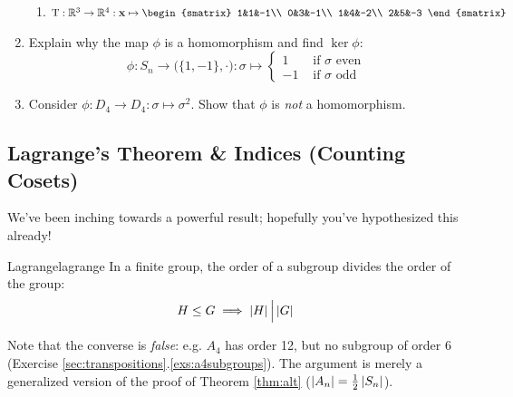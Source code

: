 \begin{exercises}{}{}
\begin{enumerate}
\begin{enumerate}
			\item $\rT:\R^3\to\R^4:\vx\mapsto 
			\begin{smatrix}
				1&1&-1\\
				0&3&-1\\
				1&4&-2\\
				2&5&-3
			\end{smatrix}$
		\end{enumerate}
		
		
		\item Explain why the map $\phi$ is a homomorphism and find $\ker\phi$:
		\[
			\phi:S_n\to \bigl(\{1,-1\},\cdot\bigr):\sigma \mapsto 
			\begin{cases}
	  		1&\text{ if $\sigma$ even}\\
	  		-1&\text{ if $\sigma$ odd}
			\end{cases}
		\]
		
		
	  \item Consider $\phi:D_4\to D_4:\sigma\mapsto \sigma^2$. Show that $\phi$ is \emph{not} a homomorphism.
	\end{enumerate}
\end{exercises}


\clearpage


\subsection{Lagrange's Theorem \& Indices (Counting Cosets)}\label{sec:lagrange}


We've been inching towards a powerful result; hopefully you've hypothesized this already!

\begin{thm}{Lagrange}{lagrange}
	In a finite group, the order of a subgroup divides the order of the group:\footnotemark
	\[
		H\le G\implies \left| H\right|\Big\vert \left| G\right|
	\]
\end{thm}

Note that the converse is \emph{false}: e.g.{} $A_4$ has order 12, but no subgroup of order 6 (Exercise \ref*{sec:transpositions}.\ref{exs:a4subgroups}). The argument is merely a generalized version of the proof of Theorem \ref{thm:alt} ($\left| A_n\right|=\frac 12\left| S_n\right|$).



